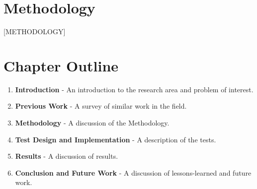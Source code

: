 \documentclass{article}
\begin{document}
\section{Methodology}

[METHODOLOGY]

%
\section{Chapter Outline}

\begin{enumerate}
\item \textbf{Introduction} - An introduction to the research area and problem of interest.  
\item \textbf{Previous Work} - A survey of similar work in the field.
\item \textbf{Methodology} - A discussion of the Methodology.
\item \textbf{Test Design and Implementation} - A description of the tests.
\item \textbf{Results} - A discussion of results.
\item \textbf{Conclusion and Future Work} - A discussion of lessons-learned and future work.
\end{enumerate}

%
%
%
\end{document}
